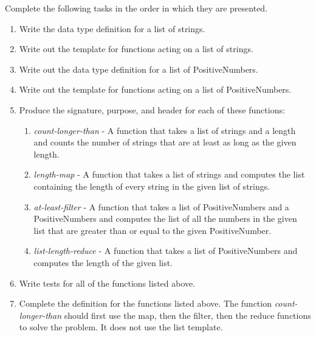 \documentclass[nobib]{tufte-handout}
\begin{document}
Complete the following tasks in the order in which they are presented.
\begin{enumerate}
  \item Write the data type definition for a list of strings.
  \item Write out the template for functions acting on a list of strings.
  \item Write out the data type definition for a list of PositiveNumbers.
  \item Write out the template for functions acting on a list of PositiveNumbers.
  \item Produce the signature, purpose, and header for each of these functions:
  \begin{enumerate}
    \item \textit{count-longer-than} - A function that takes a list of strings and a length and counts the number of strings that are at least as long as the given length.
    \item \textit{length-map} - A function that takes a list of strings and computes
      the list containing the length of every string in the given list of strings.
    \item \textit{at-least-filter} - A function that takes a list of PositiveNumbers and a PositiveNumbers and computes the list of all the numbers in the given list that are greater than or equal to the given PositiveNumber.
    \item \textit{list-length-reduce} - A function that takes a list of PositiveNumbers and computes the length of the given list.
  \end{enumerate}
  \item Write tests for all of the functions listed above.
  \item Complete the definition for the functions listed above.  The function \textit{count-longer-than} should first use the map, then the filter, then the reduce functions to solve the problem.  It does not use the list template.
\end{enumerate}
\end{document}
